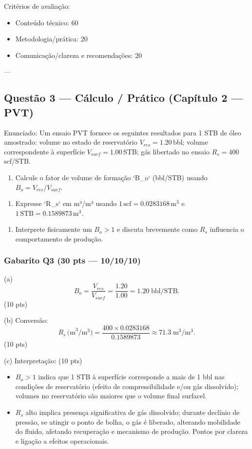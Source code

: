 \documentclass[11pt,a4paper]{article}
\begin{document}
Critérios de avaliação:
\begin{itemize}
\item Conteúdo técnico: 60%
\item Metodologia/prática: 20%
\item Comunicação/clareza e recomendações: 20%
\end{itemize}

---

\subsection{Questão 3 — Cálculo / Prático (Capítulo 2 — PVT)}

Enunciado:
Um ensaio PVT fornece os seguintes resultados para 1 STB de óleo amostrado: volume no estado de reservatório $V_{res}=1.20\,$bbl; volume correspondente à superfície $V_{surf}=1.00\,$STB; gás libertado no ensaio $R_s=400\,$scf/STB.

\begin{enumerate}[label=\Alph*)]
\item Calcule o fator de volume de formação `B_o` (bbl/STB) usando $B_o=V_{res}/V_{surf}$.\n\end{enumerate}

\begin{enumerate}[label=\Alph*)]
\item Expresse `R_s` em m³/m³ usando $1\,\text{scf}=0.0283168\,\text{m}^3$ e $1\,\text{STB}=0.1589873\,\text{m}^3$.\n\end{enumerate}

\begin{enumerate}[label=\Alph*)]
\item Interprete fisicamente um $B_o>1$ e discuta brevemente como $R_s$ influencia o comportamento de produção.\n\end{enumerate}

\subsubsection{Gabarito Q3 (30 pts — 10/10/10)}
(a) $$B_o=\dfrac{V_{res}}{V_{surf}}=\dfrac{1.20}{1.00}=1.20\;\text{bbl/STB}.$$ (10 pts)

(b) Conversão: $$R_s\,\text{(m}^3/\text{m}^3)=\dfrac{400\times0.0283168}{0.1589873}\approx71.3\;\text{m}^3/\text{m}^3.$$ (10 pts)

(c) Interpretação: (10 pts)
\begin{itemize}
\item $B_o>1$ indica que 1 STB à superfície corresponde a mais de 1 bbl nas condições de reservatório (efeito de compressibilidade e/ou gás dissolvido); volumes no reservatório são maiores que o volume final surfacel.
\item $R_s$ alto implica presença significativa de gás dissolvido; durante declínio de pressão, se atingir o ponto de bolha, o gás é liberado, alterando mobilidade do fluido, afetando recuperação e mecanismo de produção. Pontos por clareza e ligação a efeitos operacionais.
\end{itemize}
\end{document}
